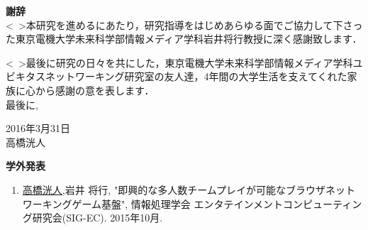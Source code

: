 \newpage

\begin{flushleft}
{\huge{\bf 謝辞}}\\
\vspace{1cm}
<\ >本研究を進めるにあたり，研究指導をはじめあらゆる面でご協力して下さった東京電機大学未来科学部情報メディア学科岩井将行教授に深く感謝致します．
\par
<\ >最後に研究の日々を共にした，東京電機大学未来科学部情報メディア学科ユビキタスネットワーキング研究室の友人達，4年間の大学生活を支えてくれた家族に心から感謝の意を表します．\\
最後に,

\vspace{3cm}
\begin{flushright}
2016年3月31日\\
高橋洸人\\
\end{flushright}
\end{flushleft}



\newpage



\begin{flushleft}
{\huge{\bf 学外発表}}\\
\vspace{1cm}
\begin{enumerate}
	
\item \underline{高橋洸人},岩井 将行, "即興的な多人数チームプレイが可能なブラウザネットワーキングゲーム基盤", 情報処理学会 エンタテインメントコンピューティング研究会(SIG-EC). 2015年10月.

\end{enumerate}
\end{flushleft}

\newpage

\renewcommand{\bibname}{参考文献}

